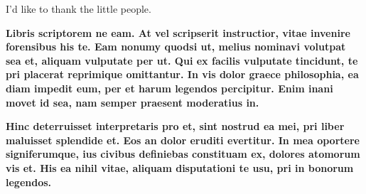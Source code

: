I'd like to thank the little people.

\textbf{Libris scriptorem ne eam. At vel scripserit instructior, vitae invenire forensibus his te. Eam nonumy quodsi ut, melius nominavi volutpat sea et, aliquam vulputate per ut. Qui ex facilis vulputate tincidunt, te pri placerat reprimique omittantur. In vis dolor graece philosophia, ea diam impedit eum, per et harum legendos percipitur. Enim inani movet id sea, nam semper praesent moderatius in.}

\textbf{Hinc deterruisset interpretaris pro et, sint nostrud ea mei, pri liber maluisset splendide et. Eos an dolor eruditi evertitur. In mea oportere signiferumque, ius civibus definiebas constituam ex, dolores atomorum vis et. His ea nihil vitae, aliquam disputationi te usu, pri in bonorum legendos.}